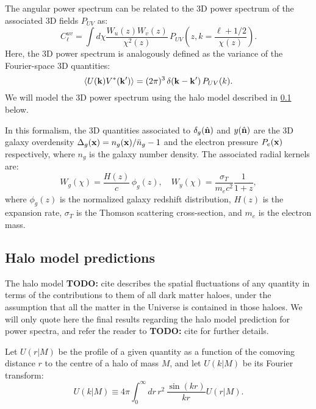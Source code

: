 \documentclass[useAMS,usenatbib]{mn2e}
\newcommand{\nv}{\hat{\bf n}}
\newcommand{\TODO}[1]{{\bf TODO:} #1}
\begin{document}
    The angular power spectrum can be related to the 3D power spectrum of the associated 3D fields $P_{UV}$ as:
    \begin{equation}
      C_\ell^{uv} = \int d\chi \frac{W_u(z)W_v(z)}{\chi^2(z)}\,P_{UV}\left( z, k=\frac{\ell+1/2}{\chi(z)} \right).
    \end{equation}
    Here, the 3D power spectrum is analogously defined as the variance of the Fourier-space 3D quantities:
    \begin{equation}
      \left\langle U({\bf k})V^*({\bf k}')\right\rangle = (2\pi)^3\,\delta({\bf k}-{\bf k}')\,P_{UV}(k).
    \end{equation}
    We will model the 3D power spectrum using the halo model described in \ref{ssec:theory.hm} below.

    In this formalism, the 3D quantities associated to $\delta_g(\nv)$ and $y(\nv)$ are the 3D galaxy overdensity $\Delta_g({\bf x})=n_g({\bf x})/\bar{n}_g-1$ and the electron pressure $P_e({\bf x})$ respectively, where $n_g$ is the galaxy number density. The associated radial kernels are:
    \begin{equation}
      W_g(\chi)=\frac{H(z)}{c}\,\phi_g(z),\hspace{12pt}W_y(\chi)=\frac{\sigma_T}{m_ec^2}\frac{1}{1+z},
    \end{equation}
    where $\phi_g(z)$ is the normalized galaxy redshift distribution, $H(z)$ is the expansion rate, $\sigma_T$ is the Thomson scattering cross-section, and $m_e$ is the electron mass.

  \subsection{Halo model predictions}\label{ssec:theory.hm}
    The halo model \TODO{cite} describes the spatial fluctuations of any quantity in terms of the contributions to them of all dark matter haloes, under the assumption that all the matter in the Universe is contained in those haloes. We will only quote here the final results regarding the halo model prediction for power spectra, and refer the reader to \TODO{cite} for further details.
    
    Let $U(r|M)$ be the profile of a given quantity as a function of the comoving distance $r$ to the centre of a halo of mass $M$, and let $U(k|M)$ be its Fourier transform:
    \begin{equation}
      U(k|M)\equiv4\pi \int_0^\infty dr\,r^2\,\frac{\sin(kr)}{kr}U(r|M).
    \end{equation}
\end{document}
